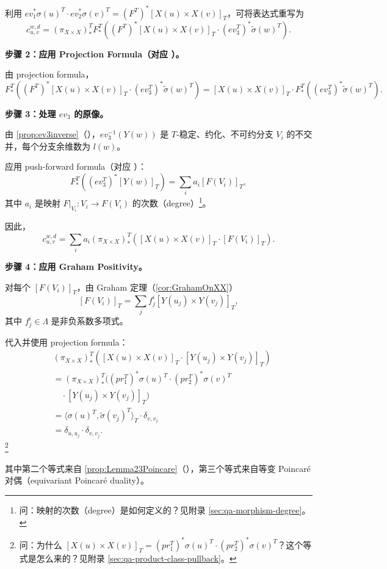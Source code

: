 利用 $ev_1^* \sigma(u)^T \cdot ev_2^* \sigma(v)^T = (F^T)^*[X(u) \times X(v)]_T$，可将表达式重写为
$$c_{u,v}^{w,d} = (\pi_{X \times X})_*^T F_*^T\left((F^T)^*[X(u) \times X(v)]_T \cdot (ev_3^T)^* \widetilde{\sigma}(w)^T\right).$$

\textbf{步骤 2：应用 Projection Formula（对应 \cite[Eq.\ (1)]{Mihalcea}）。}

由 projection formula，
$$F_*^T\left((F^T)^*[X(u) \times X(v)]_T \cdot (ev_3^T)^* \widetilde{\sigma}(w)^T\right) = [X(u) \times X(v)]_T \cdot F_*^T\left((ev_3^T)^* \widetilde{\sigma}(w)^T\right).$$

\textbf{步骤 3：处理 $ev_3$ 的原像。}

由 \cref{prop:ev3inverse}（\cite[Lemma 6.4]{Mihalcea}），$ev_3^{-1}(Y(w))$ 是 $T$-稳定、约化、不可约分支 $V_i$ 的不交并，每个分支余维数为 $l(w)$。

应用 push-forward formula（对应 \cite[Eq.\ (2)]{Mihalcea}）：
$$F_*^T\left((ev_3^T)^*[Y(w)]_T\right) = \sum_i a_i [F(V_i)]_T,$$
其中 $a_i$ 是映射 $F|_{V_i} : V_i \to F(V_i)$ 的次数（degree）\footnote{问：映射的次数（degree）是如何定义的？见附录 \cref{sec:qa-morphism-degree}。}。

因此，
$$c_{u,v}^{w,d} = \sum_i a_i (\pi_{X \times X})_*^T\left([X(u) \times X(v)]_T \cdot [F(V_i)]_T\right).$$

\textbf{步骤 4：应用 Graham Positivity。}

对每个 $[F(V_i)]_T$，由 Graham 定理（\cref{cor:GrahamOnXX}）
$$[F(V_i)]_T = \sum_j f_j^i [Y(u_j) \times Y(v_j)]_T,$$
其中 $f_j^i \in \Lambda$ 是非负系数多项式。

代入并使用 projection formula：
\begin{align*}
&(\pi_{X \times X})_*^T\left([X(u) \times X(v)]_T \cdot [Y(u_j) \times Y(v_j)]_T\right) \\
&= (\pi_{X \times X})_*^T\big((pr_1^T)^* \sigma(u)^T \cdot (pr_2^T)^* \sigma(v)^T  \\
&\quad\cdot [Y(u_j) \times Y(v_j)]_T\big) \\
&= \langle \sigma(u)^T, \widetilde{\sigma}(v_j)^T \rangle_T \cdot \delta_{v,v_j} \\
&= \delta_{u,u_j} \cdot \delta_{v,v_j}.
\end{align*}
 \footnote{问：为什么 $[X(u) \times X(v)]_T = (pr_1^T)^* \sigma(u)^T \cdot (pr_2^T)^* \sigma(v)^T$？这个等式是怎么来的？见附录 \cref{sec:qa-product-class-pullback}。}

其中第二个等式来自 \cref{prop:Lemma23Poincare}（\cite[Lemma 2.3]{Mihalcea}），第三个等式来自等变 Poincaré对偶（equivariant Poincaré duality）。

